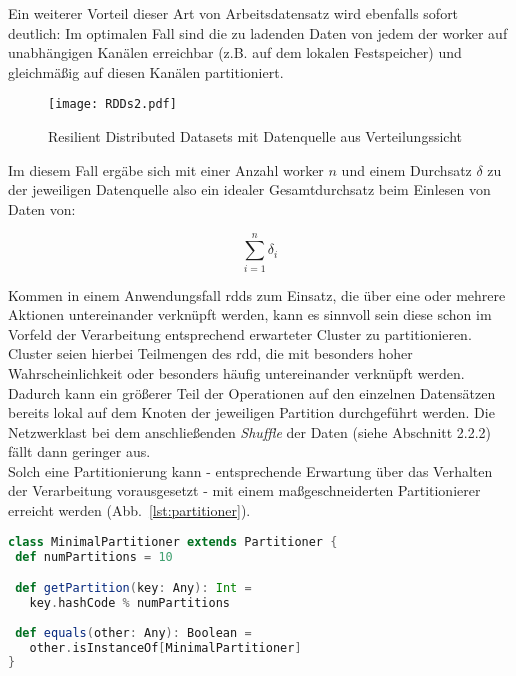 Ein weiterer Vorteil dieser Art von Arbeitsdatensatz wird ebenfalls sofort deutlich: Im optimalen Fall sind die zu ladenden Daten von jedem der \gls{worker} auf unabhängigen Kanälen erreichbar (z.B. auf dem lokalen Festspeicher) und gleichmäßig auf diesen Kanälen partitioniert.

\begin{figure}[h!]
	\centering
  \texttt{[image: RDDs2.pdf]}
	\caption{Resilient Distributed Datasets mit Datenquelle aus Verteilungssicht}
	\label{fig:rdds2}
\end{figure}

Im diesem Fall ergäbe sich mit einer Anzahl \gls{worker} $n$ und einem Durchsatz $\delta$ zu der jeweiligen Datenquelle also ein idealer Gesamtdurchsatz beim Einlesen von Daten von:

\begin{equation}
	\sum_{i=1}^{n} \delta_i
\end{equation}

Kommen in einem Anwendungsfall \gls{rdd}s zum Einsatz, die über eine oder mehrere Aktionen untereinander verknüpft werden, kann es sinnvoll sein diese schon im Vorfeld der Verarbeitung entsprechend erwarteter Cluster zu partitionieren. Cluster seien hierbei Teilmengen des \gls{rdd}, die mit besonders hoher Wahrscheinlichkeit oder besonders häufig untereinander verknüpft werden.\\

Dadurch kann ein größerer Teil der Operationen auf den einzelnen Datensätzen bereits lokal auf dem Knoten der jeweiligen Partition durchgeführt werden. Die Netzwerklast bei dem anschließenden \textit{Shuffle} der Daten (siehe Abschnitt 2.2.2) fällt dann geringer aus.\\

Solch eine Partitionierung kann - entsprechende Erwartung über das Verhalten der Verarbeitung vorausgesetzt - mit einem maßgeschneiderten Partitionierer erreicht werden (Abb.~\ref{lst:partitioner}).\\

\begin{lstlisting}[language=Scala,caption={Minimaler Partitionierer},label={lst:partitioner}]
class MinimalPartitioner extends Partitioner {
 def numPartitions = 10

 def getPartition(key: Any): Int =
   key.hashCode % numPartitions
	
 def equals(other: Any): Boolean =
   other.isInstanceOf[MinimalPartitioner]
}
\end{lstlisting}

